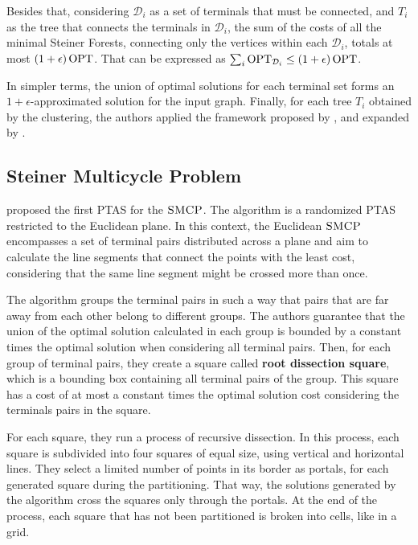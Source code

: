 Besides that, considering \(\mathcal{D}_i\) as a set of terminals that must be connected, and \(T_i\) as the tree that connects the terminals in \(\mathcal{D}_i\), the sum of the costs of all the minimal Steiner Forests, connecting only the vertices within each \(\mathcal{D}_i\), totals at most \((1 + \epsilon) \operatorname{\textrm{OPT}}\). That can be expressed as \(\sum_i \operatorname{\textrm{OPT}}_{\mathcal{D}_i} \leq (1 + \epsilon) \operatorname{\textrm{OPT}}\).

In simpler terms, the union of optimal solutions for each terminal set forms an \(1 + \epsilon\)-approximated solution for the input graph. Finally, for each tree \(T_i\) obtained by the clustering, the authors applied the framework proposed by \cite{KleinTSP}, and expanded by \cite{Borradaile2009b, Borradaile2012}.

\subsection{Steiner Multicycle Problem} \label{subsection:steinermulticycle}


\cite{LINTZMAYER2020134} proposed the first PTAS for the \(\textsc{SMCP}\). The algorithm is a randomized PTAS restricted to the Euclidean plane. In this context, the Euclidean \(\textsc{SMCP}\) encompasses a set of terminal pairs distributed across a plane and aim to calculate the line segments that connect the points with the least cost, considering that the same line segment might be crossed more than once.

The algorithm groups the terminal pairs in such a way that pairs that are far away from each other belong to different groups. The authors guarantee that the union of the optimal solution calculated in each group is bounded by a constant times the optimal solution when considering all terminal pairs. Then, for each group of terminal pairs, they create a square called \textbf{root dissection square}, which is a bounding box containing all terminal pairs of the group. This square has a cost of at most a constant times the optimal solution cost considering the terminals pairs in the square.

For each square, they run a process of recursive dissection. In this process, each square is subdivided into four squares of equal size, using vertical and horizontal lines. They select a limited number of points in its border as portals, for each generated square during the partitioning. That way, the solutions generated by the algorithm cross the squares only through the portals. At the end of the process, each square that has not been partitioned is broken into cells, like in a grid. 

